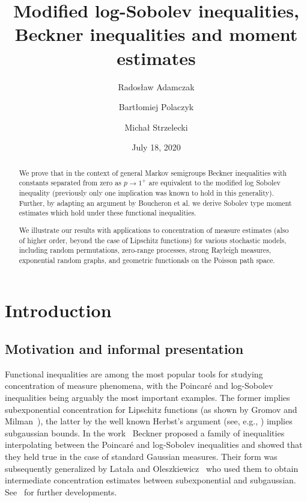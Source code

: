 \documentclass[a4paper]{amsart}
\title[Modified log-Sobolev and Beckner inequalities]{Modified log-Sobolev inequalities, Beckner inequalities and moment estimates}
\author[R. Adamczak]{Rados{\l}aw Adamczak} %
\author[B. Polaczyk]{Bart{\l}omiej Polaczyk}
\author[M. Strzelecki]{Micha{\l} Strzelecki}
\date{July 18, 2020}
\theoremstyle{definition}
\theoremstyle{remark}
\numberwithin{equation}{section}
\begin{document}
\begin{abstract}
We prove that in the context of general Markov semigroups Beckner inequalities with constants separated from zero as $p\to 1^+$ are equivalent to the modified log Sobolev inequality (previously only one implication was known to hold in this generality). Further, by adapting an argument by Boucheron et al. we derive Sobolev type moment estimates which hold under these functional inequalities.

We illustrate our results with applications to concentration of measure estimates (also of higher order, beyond the case of Lipschitz functions) for various stochastic models, including random permutations, zero-range processes, strong Rayleigh measures, exponential random graphs, and geometric functionals on the Poisson path space.


\end{abstract}

\maketitle

\tableofcontents



\section{Introduction}

\subsection{Motivation and informal presentation}
Functional inequalities are among the most popular tools for studying concentration of measure phenomena, with the Poincar\'e and log-Sobolev inequalities being arguably the most important examples.
The former implies subexponential concentration for Lipschitz functions (as shown by Gromov and Milman~\cite{MR708367}), the latter by the well known Herbst's argument (see, e.g., \cite{MR1849347,MR3185193}) implies subgaussian bounds.
In the work~\cite{MR954373} Beckner proposed a family of inequalities interpolating between the Poincar\'e and log-Sobolev inequalities and showed that they held true in the case of standard Gaussian measures.
Their form was subsequently generalized by Lata{\l}a and Oleszkiewicz~\cite{MR1796718} who used them to obtain intermediate concentration estimates between subexponential and subgaussian.
See~\cite{MR3185193} for further developments.
\end{document}
